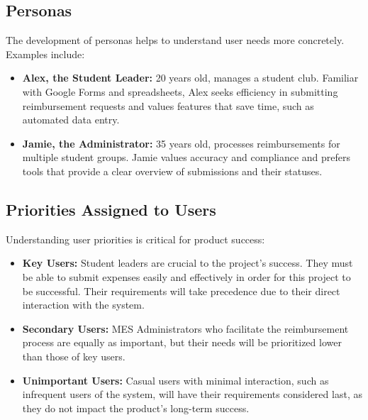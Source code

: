 \documentclass[12pt]{article}
\begin{document}
\subsection{Personas}
The development of personas helps to understand user needs more concretely. Examples include:
\begin{itemize}
    \item \textbf{Alex, the Student Leader:} 20 years old, manages a student club. Familiar with Google Forms and spreadsheets, Alex seeks efficiency in submitting reimbursement requests and values features that save time, such as automated data entry.
    \item \textbf{Jamie, the Administrator:} 35 years old, processes reimbursements for multiple student groups. Jamie values accuracy and compliance and prefers tools that provide a clear overview of submissions and their statuses.
\end{itemize}

\subsection{Priorities Assigned to Users}
Understanding user priorities is critical for product success:
\begin{itemize}
    \item \textbf{Key Users:} Student leaders are crucial to the project's success. They must be able to submit expenses easily and effectively in order for this project to be successful. Their requirements will take precedence due to their direct interaction with the system.
    \item \textbf{Secondary Users:} MES Administrators who facilitate the reimbursement process are equally as important, but their needs will be prioritized lower than those of key users.
    \item \textbf{Unimportant Users:} Casual users with minimal interaction, such as infrequent users of the system, will have their requirements considered last, as they do not impact the product's long-term success.
\end{itemize}
\end{document}
